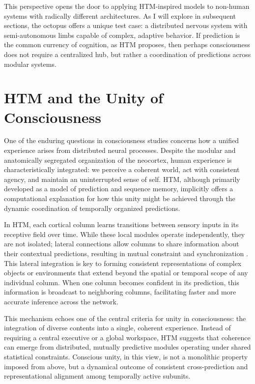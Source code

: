 \documentclass{article}
\begin{document}
This perspective opens the door to applying HTM-inspired models to non-human systems with radically different architectures. As I will explore in subsequent sections, the octopus offers a unique test case: a distributed nervous system with semi-autonomous limbs capable of complex, adaptive behavior. If prediction is the common currency of cognition, as HTM proposes, then perhaps consciousness does not require a centralized hub, but rather a coordination of predictions across modular systems.
\newpage
\section{HTM and the Unity of Consciousness}

One of the enduring questions in consciousness studies concerns how a unified experience arises from distributed neural processes. Despite the modular and anatomically segregated organization of the neocortex, human experience is characteristically integrated: we perceive a coherent world, act with consistent agency, and maintain an uninterrupted sense of self. HTM, although primarily developed as a model of prediction and sequence memory, implicitly offers a computational explanation for how this unity might be achieved through the dynamic coordination of temporally organized predictions.

In HTM, each cortical column learns transitions between sensory inputs in its receptive field over time. While these local modules operate independently, they are not isolated; lateral connections allow columns to share information about their contextual predictions, resulting in mutual constraint and synchronization \parencite{hawkins2017theory}. This lateral integration is key to forming consistent representations of complex objects or environments that extend beyond the spatial or temporal scope of any individual column. When one column becomes confident in its prediction, this information is broadcast to neighboring columns, facilitating faster and more accurate inference across the network.

This mechanism echoes one of the central criteria for unity in consciousness: the integration of diverse contents into a single, coherent experience. Instead of requiring a central executive or a global workspace, HTM suggests that coherence can emerge from distributed, mutually predictive modules operating under shared statistical constraints. Conscious unity, in this view, is not a monolithic property imposed from above, but a dynamical outcome of consistent cross-prediction and representational alignment among temporally active subunits.
\end{document}

